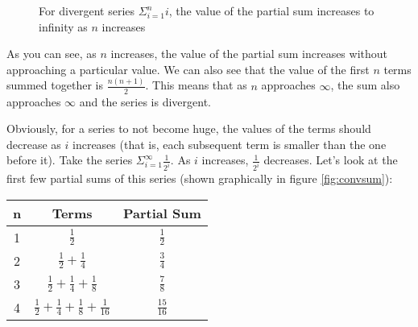 \begin{figure}[htbp]
\centering
    \caption{For divergent series $\Sigma_{i=1}^n i$, the value of the 
    partial sum increases to infinity as $n$ increases}
    \label{fig:divsum}
\end{figure}

As you can see, as $n$ increases, the value of the partial sum 
increases without approaching a particular value. We can also see 
that the value of the first $n$ terms summed together is 
$\frac{n(n+1)}{2}$. This means that as $n$ approaches $\infty$, the 
sum also approaches $\infty$ and the series is divergent. 

Obviously, for a series to not become huge, the values of the terms 
should decrease as $i$ increases (that is, each subsequent term is 
smaller than the one before it). Take the series $\Sigma_{i=1}^\infty 
\frac{1}{2^i}$. As $i$ increases, $\frac{1}{2^i}$ decreases. Let's 
look at the first few partial sums of this series (shown graphically 
in figure \ref{fig:convsum}):
\begin{center}
\begin{tabular}{|c|c|c|}\hline
n & Terms & Partial Sum\\
\hline
1 & $\frac{1}{2}$ & $\frac{1}{2}$\\
\hline
2 & $\frac{1}{2} + \frac{1}{4}$ & $\frac{3}{4}$\\
\hline
3 & $\frac{1}{2} + \frac{1}{4} + \frac{1}{8}$ & $\frac{7}{8}$\\
\hline
4 & $\frac{1}{2} + \frac{1}{4} + \frac{1}{8} + \frac{1}{16}$ & 
$\frac{15}{16}$\\
\hline
\end{tabular}
\end{center}

